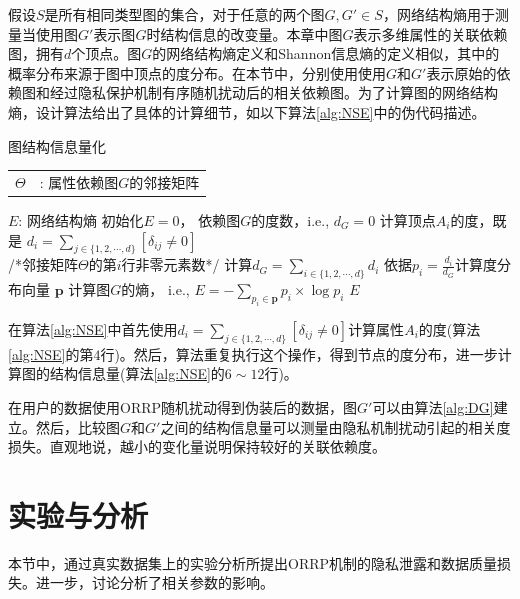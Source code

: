假设$S$是所有相同类型图的集合，对于任意的两个图$G,G' \in S$，网络结构熵用于测量当使用图$G'$表示图$G$时结构信息的改变量。本章中图$G$表示多维属性的关联依赖图，拥有$d$个顶点。图$G$的网络结构熵定义和Shannon信息熵的定义相似，其中的概率分布来源于图中顶点的度分布。在本节中，分别使用使用$G$和$G'$表示原始的依赖图和经过隐私保护机制有序随机扰动后的相关依赖图。为了计算图的网络结构熵，设计算法给出了具体的计算细节，如以下算法\ref{alg:NSE}中的伪代码描述。
\begin{algorithm}[htb]
 \small
\caption{图结构信息量化}
\label{alg:NSE}
\begin{algorithmic}[1]
\REQUIRE
\begin{tabular}[t]{p{3mm}l}
 $\Theta$&: 属性依赖图$G$的邻接矩阵\\
\end{tabular}
\ENSURE
$E$: 网络结构熵
\STATE 初始化$E=0$， 依赖图$G$的度数，i.e., $d_{G}=0$
\STATE 计算顶点$A_i$的度，既是 $d_i=\sum_{j\in\{1,2,\cdots,d\}}[\delta_{ij}\neq 0]$ \\
/*邻接矩阵$\Theta$的第$i$行非零元素数*/
\ENDFOR
\STATE 计算$d_{G}=\sum_{i\in\{1,2,\cdots,d\}}d_{i}$
\ENDFOR
{}
\STATE 依据$p_i=\frac{d_i}{d_G}$计算度分布向量 $\mathbf{p}$
\ENDFOR
\STATE 计算图$G$的熵， i.e., $E=-\sum_{p_i\in \mathbf{p}}p_i\times \log p_i$
\RETURN $E$
\end{algorithmic}
\end{algorithm}

在算法\ref{alg:NSE}中首先使用$d_i=\sum_{j\in\{1,2,\cdots,d\}}[\delta_{ij}\neq 0]$计算属性$A_i$的度(算法\ref{alg:NSE}的第$4$行)。然后，算法重复执行这个操作，得到节点的度分布，进一步计算图的结构信息量(算法\ref{alg:NSE}的$6 \sim 12$行)。

在用户的数据使用ORRP随机扰动得到伪装后的数据，图$G'$可以由算法\ref{alg:DG}建立。然后，比较图$G$和$G'$之间的结构信息量可以测量由隐私机制扰动引起的相关度损失。直观地说，越小的变化量说明保持较好的关联依赖度。

\section{实验与分析}\label{sec:chapter05-experiment}
本节中，通过真实数据集上的实验分析所提出ORRP机制的隐私泄露和数据质量损失。进一步，讨论分析了相关参数的影响。

